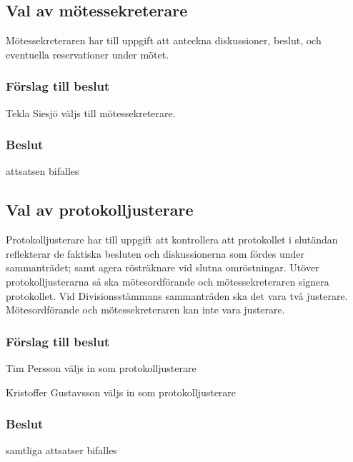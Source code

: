 \documentclass[protokoll]{dvd}
\begin{document}
\subsection{Val av mötessekreterare}
Mötessekreteraren har till uppgift att anteckna diskussioner, beslut, och eventuella reservationer under mötet.
\subsubsection*{Förslag till beslut}
\begin{attsatser}
    \item Tekla Siesjö väljs till mötessekreterare.
\end{attsatser}
\subsubsection*{Beslut}
\begin{attsatser}
    \item attsatsen bifalles
\end{attsatser}

\subsection{Val av protokolljusterare}
Protokolljusterare har till uppgift att kontrollera att protokollet i slutändan reflekterar de
faktiska besluten och diskussionerna som fördes under sammanträdet; samt agera rösträknare vid slutna omröstningar.
Utöver protokolljusterarna så ska mötesordförande och mötessekreteraren signera protokollet.
Vid Divisionsstämmans sammanträden ska det vara två justerare.
Mötesordförande och mötessekreteraren kan inte vara justerare.
\subsubsection*{Förslag till beslut}
\begin{attsatser}
    \item Tim Persson väljs in som protokolljusterare
    \item Kristoffer Gustavsson väljs in som protokolljusterare
\end{attsatser}
\subsubsection*{Beslut}
\begin{attsatser}
    \item samtliga attsatser bifalles
\end{attsatser}
\end{document}
